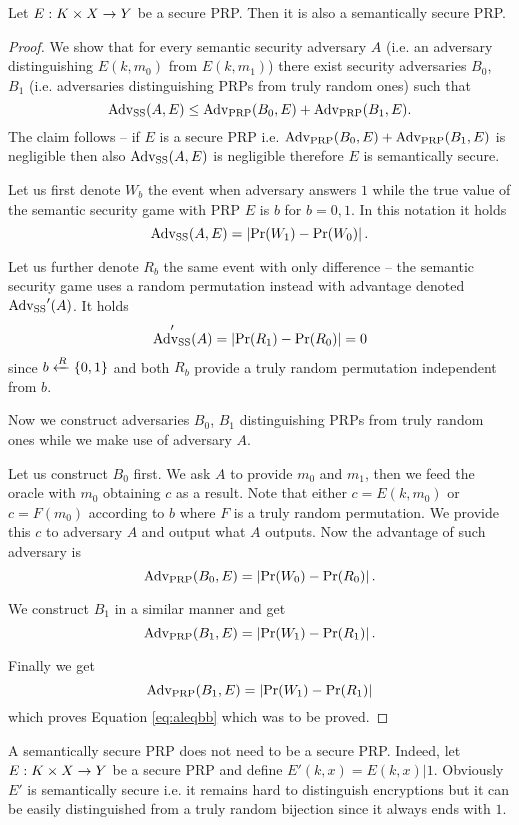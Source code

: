 \begin{thm}
	Let $E: K\times X\rightarrow Y$ be a secure PRP. Then it is also a semantically secure PRP.
\end{thm}
\begin{proof}
	We show that for every semantic security adversary $A$ (i.e. an adversary distinguishing $E(k,m_0)$ from $E(k,m_1)$) there exist security adversaries $B_0$, $B_1$ (i.e. adversaries distinguishing PRPs from truly random ones) such that
	\begin{equation}
	\label{eq:aleqbb}
		\operatorname*{Adv_{SS}}(A,E) \leq \operatorname*{Adv_{PRP}}(B_0,E) + \operatorname*{Adv_{PRP}}(B_1,E) .
	\end{equation}
	The claim follows -- if $E$ is a secure PRP i.e. $\operatorname*{Adv_{PRP}}(B_0,E) + \operatorname*{Adv_{PRP}}(B_1,E)$ is negligible then also $\operatorname*{Adv_{SS}}(A,E)$ is negligible therefore $E$ is semantically secure.
	
	Let us first denote $W_b$ the event when adversary answers $1$ while the true value of the semantic security game with PRP $E$ is $b$ for $b=0,1$. In this notation it holds
	\[
		\operatorname*{Adv_{SS}}(A,E) = \left| \Pr(W_1) - \Pr(W_0) \right| .
	\]
	
	Let us further denote $R_b$ the same event with only difference -- the semantic security game uses a random permutation instead with advantage denoted $\operatorname*{Adv_{SS}}'(A)$. It holds
	\[
		\operatorname*{Adv_{SS}}'(A) = \left| \Pr(R_1) - \Pr(R_0) \right| = 0
	\]
	since $b\xleftarrow{R}\{0,1\}$ and both $R_b$ provide a truly random permutation independent from $b$.
	
	Now we construct adversaries $B_0$, $B_1$ distinguishing PRPs from truly random ones while we make use of adversary $A$.
	
	Let us construct $B_0$ first. We ask $A$ to provide $m_0$ and $m_1$, then we feed the oracle with $m_0$ obtaining $c$ as a result. Note that either $c=E(k,m_0)$ or $c=F(m_0)$ according to $b$ where $F$ is a truly random permutation. We provide this $c$ to adversary $A$ and output what $A$ outputs. Now the advantage of such adversary is
	\[
		\operatorname*{Adv_{PRP}}(B_0,E) = \left| \Pr(W_0) - \Pr(R_0) \right| .
	\]
	
	We construct $B_1$ in a similar manner and get
	\[
		\operatorname*{Adv_{PRP}}(B_1,E) = \left| \Pr(W_1) - \Pr(R_1) \right| .
	\]
	
	Finally we get
	\[
		\operatorname*{Adv_{PRP}}(B_1,E) = \left| \Pr(W_1) - \Pr(R_1) \right|
	\]
	which proves Equation \ref{eq:aleqbb} which was to be proved.
\end{proof}

\begin{note}
	A semantically secure PRP does not need to be a secure PRP. Indeed, let $E: K\times X\rightarrow Y$ be a secure PRP and define $E'(k,x) = E(k,x)|1$. Obviously $E'$ is semantically secure i.e. it remains hard to distinguish encryptions but it can be easily distinguished from a truly random bijection since it always ends with $1$.
\end{note}

